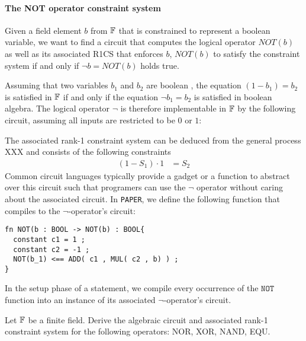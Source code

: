 \paragraph{The NOT operator constraint system} Given a field element $b$ from $\mathbb{F}$ that is constrained to represent a boolean variable, we want to find a circuit that computes the logical  operator $NOT(b)$ as well as its associated R1CS that enforces $b$, $NOT(b)$ to satisfy the constraint system if and only if $\lnot b = NOT(b)$ holds true. 

Assuming that two variables $b_1$ and $b_2$ are boolean , the equation $(1-b_1) = b_2$ is satisfied in $\mathbb{F}$ if and only if the equation $\lnot b_1 = b_2$ is satisfied in boolean algebra. The logical operator $\lnot$ is therefore implementable in $\mathbb{F}$ by the following circuit, assuming all inputs are restricted to be $0$ or $1$:
\begin{center}
\end{center}
The associated rank-1 constraint system can be deduced from the general process XXX and consists of the following constraints
\begin{align*}
  (1-S_1)\cdot 1 &= S_2
\end{align*}
Common circuit languages typically provide a gadget or a function to abstract over this circuit such that programers can use the $\lnot$ operator without caring about the associated circuit. In \texttt{PAPER}, we define the following function that compiles to the $\lnot$-operator's circuit:
\begin{lstlisting}
fn NOT(b : BOOL -> NOT(b) : BOOL{
  constant c1 = 1 ;
  constant c2 = -1 ;
  NOT(b_1) <== ADD( c1 , MUL( c2 , b) ) ;
}
\end{lstlisting}
In the setup phase of a statement, we compile every occurrence of the $\mathtt{NOT}$ function into an instance of its associated $\lnot$-operator's circuit.
\begin{exercise}
Let $\mathbb{F}$ be a finite field. Derive the algebraic circuit and associated rank-1 constraint system for the following operators: NOR, XOR, NAND, EQU.
\end{exercise}
